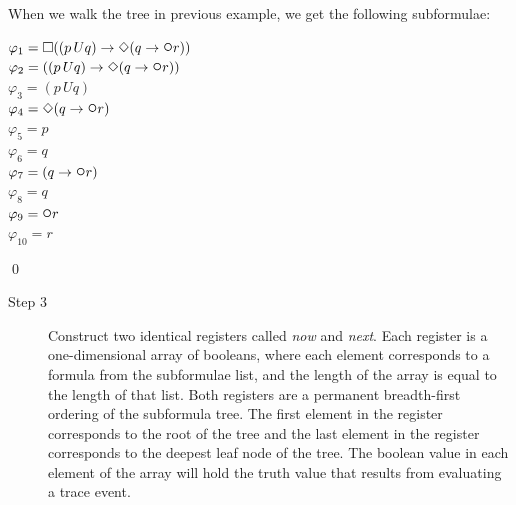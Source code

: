 \begin{myEx} When we walk the tree in previous example, we get the following subformulae:%
\begin{flushleft}
$ \varphi_{1} = \LTLalways((p \,U q) \rightarrow \LTLeventually(q \rightarrow \LTLnext r)) $ \\
$ \varphi_{2} = ((p \,U q) \rightarrow \LTLeventually(q \rightarrow \LTLnext r)) $ \\
$ \varphi_{3} = (p \,U q) $ \\
$ \varphi_{4} = \LTLeventually(q \rightarrow \LTLnext r) $ \\
$ \varphi_{5} = p $ \\
$ \varphi_{6} = q $ \\
$ \varphi_{7} = (q \rightarrow \LTLnext r) $ \\
$ \varphi_{8} = q $ \\
$ \varphi_{9} = \LTLnext r $ \\
$ \varphi_{10} = r $ 
\end{flushleft}
\qed
\end{myEx}

\begin{description}
\item[Step 3] Construct two identical registers called \textit{now} and \textit{next}.  Each register is a one-dimensional array of booleans, where each element corresponds to a formula from the subformulae list, and the length of the array is equal to the length of that list.  Both registers are a permanent breadth-first ordering of the subformula tree.  The first element in the register corresponds to the root of the tree and the last element in the register corresponds to the deepest leaf node of the tree.  The boolean value in each element of the array will hold the truth value that results from evaluating a trace event.\\
\end{description}

